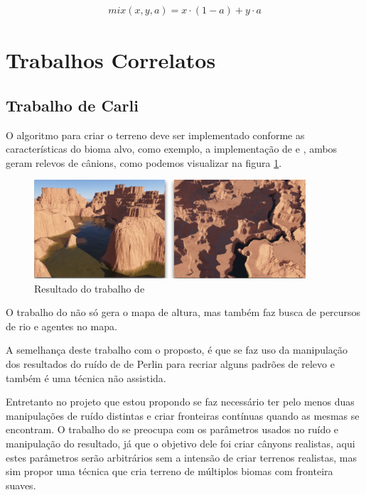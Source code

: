 \begin{equation}\label{eq:mixfunc}
  \begin{split}
    mix(x, y, a) = x \cdot (1 - a) + y \cdot a
  \end{split}
\end{equation}

\section{Trabalhos Correlatos}
\subsection{Trabalho de Carli}
O algoritmo para criar o terreno deve ser implementado conforme as
características do bioma alvo, como exemplo, a implementação de 
\cite{gabrielle2016canion} e \cite{carli2012canion}, ambos geram relevos de
cânions, como podemos visualizar na figura \ref{fig:carli2012result}.
\begin{figure}[H]
    \centering
    \includegraphics[width=0.9\textwidth]{figuras/carli2012result.png}
    \caption{Resultado do trabalho de \cite{carli2012canion}}
    \label{fig:carli2012result}
\end{figure}

O trabalho do \cite{carli2012canion} não só gera o mapa de altura, mas também
faz busca de percursos de rio e agentes no mapa.

A semelhança deste 
trabalho com o proposto, é que se faz uso da manipulação dos resultados do ruído de
de Perlin para recriar alguns padrões de relevo e também é uma técnica não assistida.

Entretanto no projeto que 
estou propondo se faz necessário ter pelo menos duas manipulações de ruído distintas
e criar fronteiras contínuas quando as mesmas se encontram. O trabalho 
do \cite{carli2012canion} se preocupa com os parâmetros usados no ruído e manipulação do
resultado, já que o objetivo dele foi criar cânyons realistas, aqui estes parâmetros serão arbitrários
sem a intensão de criar terrenos realistas, mas sim propor uma técnica que cria terreno de múltiplos biomas com fronteira suaves.


